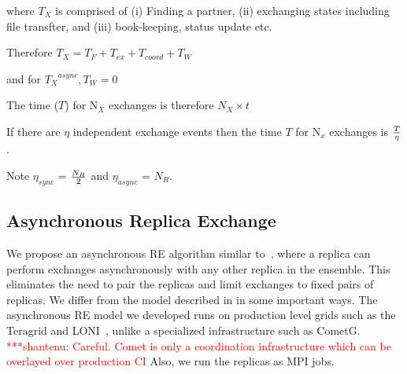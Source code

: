 \documentclass{rspublic}
\newcommand{\jhanote}[1]{ {\textcolor{red} { ***shantenu: #1 }}}
\newcommand{\jhanote}[1]{}
\begin{document}
where $T_{X}$ is comprised of (i) Finding a partner, (ii) exchanging
states including file transfter, and (iii) book-keeping, status update
etc. 

Therefore ${T_{X}} = {T_F + T_{ex} + T_{coord}} + T_W$ 


and for ${T_{X}}^{async}, T_W = 0$


The time ($T$) for N$_{X}$ exchanges is therefore $N_{X} \times t$

If there are $\eta$ independent exchange events then the time $T$ for 
N$_x$ exchanges is $T \over \eta$.

Note $\eta_{sync}$ = $N_R \over 2$ and $\eta_{async}$ = $N_R $. \\






  
\subsection{Asynchronous Replica Exchange}


We propose an asynchronous RE algorithm similar
to~\citep{parashar_arepex}, where a replica can perform exchanges
asynchronously with any other replica in the ensemble. This eliminates
the need to pair the replicas and limit exchanges to fixed pairs of
replicas. We differ from the model described in \cite{parashar_arepex}
in some important ways. The asynchronous RE model we developed runs on
production level grids such as the Teragrid and LONI~\citep{LONI_web},
unlike a specialized infrastructure such as CometG.
\jhanote{Careful. Comet is only a coordination infrastructure which
  can be overlayed over production CI} Also, we run the replicas as
MPI jobs.

\end{document}
